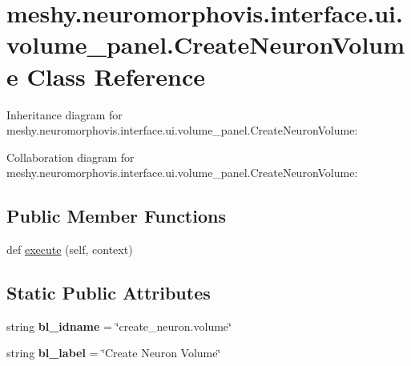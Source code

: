 \hypertarget{classmeshy_1_1neuromorphovis_1_1interface_1_1ui_1_1volume__panel_1_1CreateNeuronVolume}{}\section{meshy.\+neuromorphovis.\+interface.\+ui.\+volume\+\_\+panel.\+Create\+Neuron\+Volume Class Reference}
\label{classmeshy_1_1neuromorphovis_1_1interface_1_1ui_1_1volume__panel_1_1CreateNeuronVolume}


Inheritance diagram for meshy.\+neuromorphovis.\+interface.\+ui.\+volume\+\_\+panel.\+Create\+Neuron\+Volume\+:


Collaboration diagram for meshy.\+neuromorphovis.\+interface.\+ui.\+volume\+\_\+panel.\+Create\+Neuron\+Volume\+:
\subsection*{Public Member Functions}
\begin{DoxyCompactItemize}
\item 
def \hyperlink{classmeshy_1_1neuromorphovis_1_1interface_1_1ui_1_1volume__panel_1_1CreateNeuronVolume_a2534ad461ef406549fbb1e8c17a1f563}{execute} (self, context)
\end{DoxyCompactItemize}
\subsection*{Static Public Attributes}
\begin{DoxyCompactItemize}
\item 
string {\bfseries bl\+\_\+idname} = \char`\"{}create\+\_\+neuron.\+volume\char`\"{}\hypertarget{classmeshy_1_1neuromorphovis_1_1interface_1_1ui_1_1volume__panel_1_1CreateNeuronVolume_a65e3b8e8f0f9699791237dc86d99623e}{}\label{classmeshy_1_1neuromorphovis_1_1interface_1_1ui_1_1volume__panel_1_1CreateNeuronVolume_a65e3b8e8f0f9699791237dc86d99623e}

\item 
string {\bfseries bl\+\_\+label} = \char`\"{}Create Neuron Volume\char`\"{}\hypertarget{classmeshy_1_1neuromorphovis_1_1interface_1_1ui_1_1volume__panel_1_1CreateNeuronVolume_a5ee39bcd6fc1e248eb60cb6cc6870bf2}{}\label{classmeshy_1_1neuromorphovis_1_1interface_1_1ui_1_1volume__panel_1_1CreateNeuronVolume_a5ee39bcd6fc1e248eb60cb6cc6870bf2}

\end{DoxyCompactItemize}


